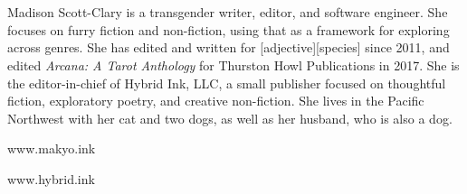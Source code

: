 \chapter*{}

\thispagestyle{empty}
\null
\vfill

\noindent Madison Scott-Clary is a transgender writer, editor, and software engineer. She focuses on furry fiction and non-fiction, using that as a framework for exploring across genres. She has edited and written for [adjective][species] since 2011, and edited \emph{Arcana: A Tarot Anthology} for Thurston Howl Publications in 2017. She is the editor-in-chief of Hybrid Ink, LLC, a small publisher focused on thoughtful fiction, exploratory poetry, and creative non-fiction. She lives in the Pacific Northwest with her cat and two dogs, as well as her husband, who is also a dog.

\begin{center}
    www.makyo.ink

    www.hybrid.ink
\end{center}

\vfill
